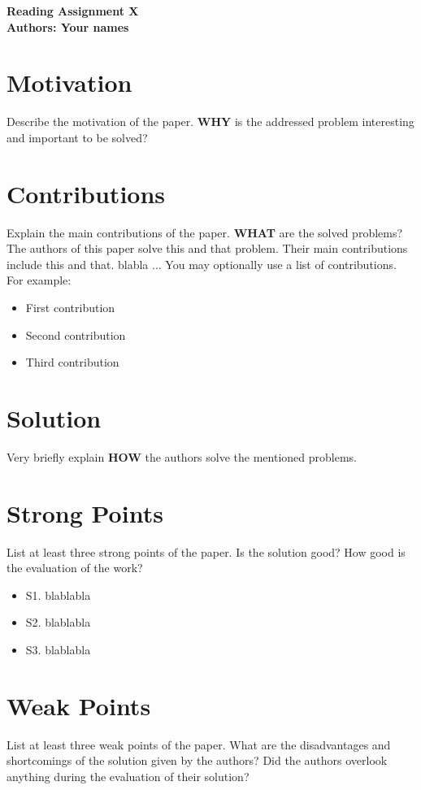 \documentclass[10pt]{proc}
\begin{document}
\large{\textbf{Reading Assignment X}}\\

\large{\textbf{Authors: Your names}}\\

\section{Motivation}
Describe the motivation of the paper. \textbf{WHY} is the addressed problem interesting and important to be solved?

\section{Contributions}
Explain the main contributions of the paper. \textbf{WHAT} are the solved problems?
The authors of this paper solve this and that problem. Their main contributions include this and that. blabla ...
You may optionally use a list of contributions. For example:
\begin{itemize}
 \item First contribution
 \item Second contribution
 \item Third contribution
\end{itemize}

\section{Solution}
Very briefly explain \textbf{HOW} the authors solve the mentioned problems.

\section{Strong Points}
List at least three strong points of the paper.
Is the solution good? How good is the evaluation of the work?

\begin{itemize}
 \item S1. blablabla
 \item S2. blablabla
 \item S3. blablabla
\end{itemize}

\section{Weak Points}
List at least three weak points of the paper.
What are the disadvantages and shortcomings of the solution given by the authors? Did the authors overlook anything during the evaluation of their solution?
\end{document}
